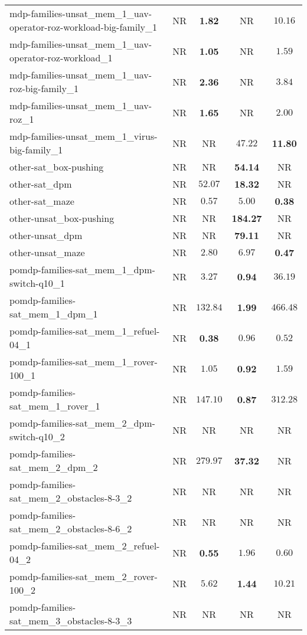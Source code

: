 \begin{tabular}{lcccc}
mdp-families-unsat\_mem\_1\_uav-operator-roz-workload-big-family\_1 & NR & \textbf{1.82} & NR & $10.16$ \\
mdp-families-unsat\_mem\_1\_uav-operator-roz-workload\_1 & NR & \textbf{1.05} & NR & $1.59$ \\
mdp-families-unsat\_mem\_1\_uav-roz-big-family\_1 & NR & \textbf{2.36} & NR & $3.84$ \\
mdp-families-unsat\_mem\_1\_uav-roz\_1 & NR & \textbf{1.65} & NR & $2.00$ \\
mdp-families-unsat\_mem\_1\_virus-big-family\_1 & NR & NR & $47.22$ & \textbf{11.80} \\
other-sat\_box-pushing & NR & NR & \textbf{54.14} & NR \\
other-sat\_dpm & NR & $52.07$ & \textbf{18.32} & NR \\
other-sat\_maze & NR & $0.57$ & $5.00$ & \textbf{0.38} \\
other-unsat\_box-pushing & NR & NR & \textbf{184.27} & NR \\
other-unsat\_dpm & NR & NR & \textbf{79.11} & NR \\
other-unsat\_maze & NR & $2.80$ & $6.97$ & \textbf{0.47} \\
pomdp-families-sat\_mem\_1\_dpm-switch-q10\_1 & NR & $3.27$ & \textbf{0.94} & $36.19$ \\
pomdp-families-sat\_mem\_1\_dpm\_1 & NR & $132.84$ & \textbf{1.99} & $466.48$ \\
pomdp-families-sat\_mem\_1\_refuel-04\_1 & NR & \textbf{0.38} & $0.96$ & $0.52$ \\
pomdp-families-sat\_mem\_1\_rover-100\_1 & NR & $1.05$ & \textbf{0.92} & $1.59$ \\
pomdp-families-sat\_mem\_1\_rover\_1 & NR & $147.10$ & \textbf{0.87} & $312.28$ \\
pomdp-families-sat\_mem\_2\_dpm-switch-q10\_2 & NR & NR & NR & NR \\
pomdp-families-sat\_mem\_2\_dpm\_2 & NR & $279.97$ & \textbf{37.32} & NR \\
pomdp-families-sat\_mem\_2\_obstacles-8-3\_2 & NR & NR & NR & NR \\
pomdp-families-sat\_mem\_2\_obstacles-8-6\_2 & NR & NR & NR & NR \\
pomdp-families-sat\_mem\_2\_refuel-04\_2 & NR & \textbf{0.55} & $1.96$ & $0.60$ \\
pomdp-families-sat\_mem\_2\_rover-100\_2 & NR & $5.62$ & \textbf{1.44} & $10.21$ \\
pomdp-families-sat\_mem\_3\_obstacles-8-3\_3 & NR & NR & NR & NR \\

\end{tabular}

